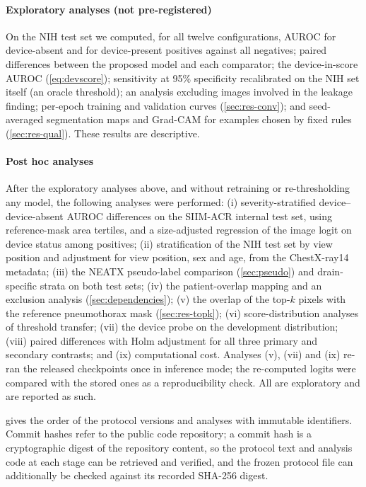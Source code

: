 \documentclass{ieeeaccess}
\begin{document}
\paragraph{Exploratory analyses (not pre-registered)} On the NIH test set we computed, for all twelve configurations, AUROC for device-absent and for device-present positives against all negatives; paired differences between the proposed model and each comparator; the device-in-score AUROC (\cref{eq:devscore}); sensitivity at 95\% specificity recalibrated on the NIH set itself (an oracle threshold); an analysis excluding images involved in the leakage finding; per-epoch training and validation curves (\cref{sec:res-conv}); and seed-averaged segmentation maps and Grad-CAM \cite{selvaraju2020gradcam} for examples chosen by fixed rules (\cref{sec:res-qual}). These results are descriptive.

\paragraph{Post hoc analyses} After the exploratory analyses above, and without retraining or re-thresholding any model, the following analyses were performed: (i) severity-stratified device--device-absent AUROC differences on the SIIM-ACR internal test set, using reference-mask area tertiles, and a size-adjusted regression of the image logit on device status among positives; (ii) stratification of the NIH test set by view position and adjustment for view position, sex and age, from the ChestX-ray14 metadata; (iii) the NEATX pseudo-label comparison (\cref{sec:pseudo}) and drain-specific strata on both test sets; (iv) the patient-overlap mapping and an exclusion analysis (\cref{sec:dependencies}); (v) the overlap of the top-$k$ pixels with the reference pneumothorax mask (\cref{sec:res-topk}); (vi) score-distribution analyses of threshold transfer; (vii) the device probe on the development distribution; (viii) paired differences with Holm adjustment for all three primary and secondary contrasts; and (ix) computational cost. Analyses (v), (vii) and (ix) re-ran the released checkpoints once in inference mode; the re-computed logits were compared with the stored ones as a reproducibility check. All are exploratory and are reported as such.

 gives the order of the protocol versions and analyses with immutable identifiers. Commit hashes refer to the public code repository; a commit hash is a cryptographic digest of the repository content, so the protocol text and analysis code at each stage can be retrieved and verified, and the frozen protocol file can additionally be checked against its recorded SHA-256 digest.
\end{document}
